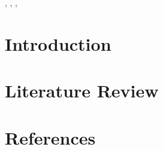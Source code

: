 \documentclass[review,11pt]{elsarticle}
\theoremstyle{definition}
\theoremstyle{remark}
\begin{document}
\renewcommand{\baselinestretch}{1.5}
\title{}
\author[ustc]{}

\author[ustc]{}

\author[ustc]{}




\address[ustc]{The School of Management, University of Science and Technology of China, Hefei 230026, China}



\begin{abstract}

\end{abstract}
\begin{keyword}
\sep
\sep
\sep

 \end{keyword}

\maketitle
\section{Introduction}

\section{Literature Review}

\section*{References}
\end{document}
